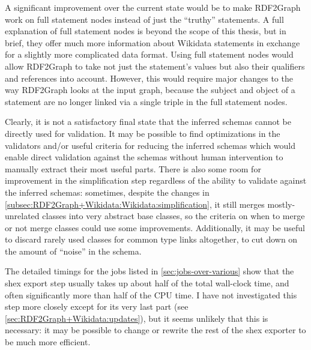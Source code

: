A significant improvement over the current state
would be to make \gls{RDF2Graph} work on full \gls{statement} nodes instead of just the “truthy” \glspl{statement}.
A full explanation of full \gls{statement} nodes is beyond the scope of this thesis,
but in brief, they offer much more information about \gls{Wikidata} \glspl{statement}
in exchange for a slightly more complicated data format.
Using full \gls{statement} nodes would allow \gls{RDF2Graph} to take not just the \gls{statement}’s values
but also their \glspl{qualifier} and \glspl{reference} into account.
However, this would require major changes to the way \gls{RDF2Graph} looks at the input graph,
because the \gls{subject} and \gls{object} of a \gls{statement} are no longer linked via a single \gls{triple}
in the full \gls{statement} nodes.

Clearly, it is not a satisfactory final state
that the inferred \glspl{schema} cannot be directly used for validation.
It may be possible to find optimizations in the validators
and/or useful criteria for reducing the inferred \glspl{schema}
which would enable direct validation against the \glspl{schema}
without human intervention to manually extract their most useful parts.
There is also some room for improvement in the simplification step
regardless of the ability to validate against the inferred \glspl{schema}:
sometimes, despite the changes in \cref{subsec:RDF2Graph+Wikidata:Wikidata:simplification},
it still merges mostly-unrelated classes into very abstract base classes,
so the criteria on when to merge or not merge classes could use some improvements.
Additionally, it may be useful to discard rarely used classes for common type links altogether,
to cut down on the amount of “noise” in the schema.

The detailed timings for the jobs listed in \cref{sec:jobs-over-various}
show that the \gls{shex} export step usually takes up about half of the total wall-clock time,
and often significantly more than half of the CPU time.
I have not investigated this step more closely except for its very last part
(see \cref{sec:RDF2Graph+Wikidata:updates}),
but it seems unlikely that this is necessary:
it may be possible to change or rewrite the rest of the \gls{shex} exporter to be much more efficient.

